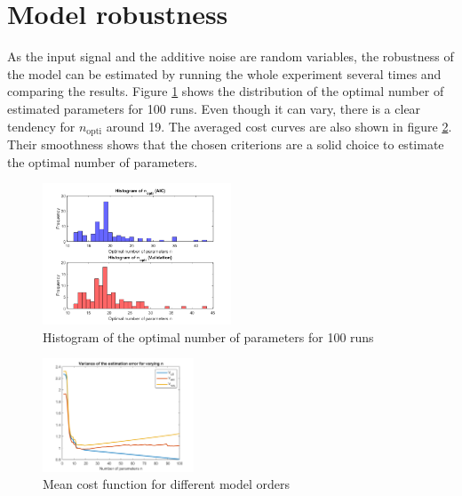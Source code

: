 \documentclass[10pt,twocolumn]{article}
\begin{document}
\section{Model robustness}

As the input signal and the additive noise are random variables, the robustness of the model can be estimated by running the whole experiment several times and comparing the results. Figure \ref{fig:histogram} shows the distribution of the optimal number of estimated parameters for 100 runs. Even though it can vary, there is a clear tendency for $n_{\text{opti}}$ around 19. The averaged cost curves are also shown in figure \ref{fig:mean}. Their smoothness shows that the chosen criterions are a solid choice to estimate the optimal number of parameters.

\begin{figure}
    \centering
    \includegraphics[width=0.5\textwidth]{pic/histogram.png}
    \caption{Histogram of the optimal number of parameters for 100 runs}
    \label{fig:histogram}
\end{figure}

\vspace{0cm} %
\begin{figure}[!ht]
    \centering
    \includegraphics[width=0.4\textwidth]{pic/mean.png}
    \caption{Mean cost function for different model orders}
    \label{fig:mean}
\end{figure}
\end{document}

